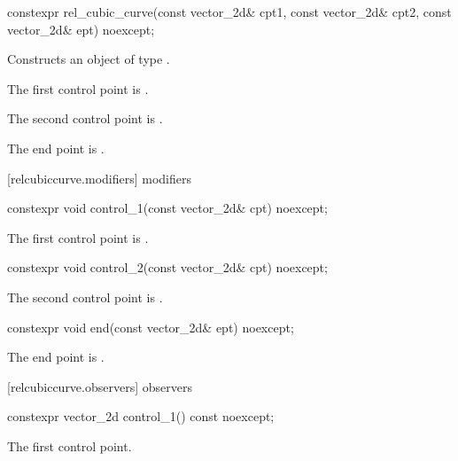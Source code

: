 %
\begin{itemdecl}
constexpr rel_cubic_curve(const vector_2d& cpt1, const vector_2d& cpt2,
  const vector_2d& ept) noexcept;
\end{itemdecl}
\begin{itemdescr}
\pnum
\effects
Constructs an object of type .

\pnum
The first control point is .

\pnum
The second control point is .

\pnum
The end point is .
\end{itemdescr}

 [relcubiccurve.modifiers]{ modifiers}%

%
\begin{itemdecl}
constexpr void control_1(const vector_2d& cpt) noexcept;
\end{itemdecl}
\begin{itemdescr}
\pnum
\effects
The first control point is .
\end{itemdescr}

%
\begin{itemdecl}
constexpr void control_2(const vector_2d& cpt) noexcept;
\end{itemdecl}
\begin{itemdescr}
\pnum
\effects
The second control point is .
\end{itemdescr}

%
\begin{itemdecl}
constexpr void end(const vector_2d& ept) noexcept;
\end{itemdecl}
\begin{itemdescr}
\pnum
\effects
The end point is .
\end{itemdescr}

 [relcubiccurve.observers]{ observers}%

%
\begin{itemdecl}
constexpr vector_2d control_1() const noexcept;
\end{itemdecl}
\begin{itemdescr}
\pnum
\returns
The first control point.
\end{itemdescr}

